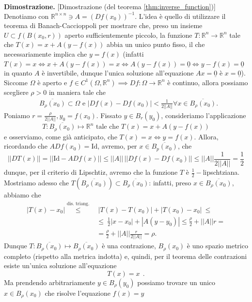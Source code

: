 \noindent \textbf{Dimostrazione. } [Dimostrazione (del teorema \ref{thm:inverse_function})]
	Denotiamo con $\mathbb{R}^{n \times n} \ni A = (Df(x_0))^{-1}$. L'idea è quello di utilizzare il teorema di Banach-Caccioppoli per mostrare che, preso un insieme $U \subset f(B(x_0, r))$ aperto sufficientemente piccolo, la funzione $T: \mathbb{R}^n \to \mathbb{R}^n$ tale che $T(x) = x + A(y - f(x))$ abbia un unico punto fisso, il che necessariamente implica che $y = f(x)$ (infatti $T(x) = x \iff x + A(y-f(x)) = x \iff A(y-f(x)) = \underline{0} \iff y - f(x) = \underline{0}$ in quanto $A$ è invertibile, dunque l'unica soluzione all'equazione $Ax = \underline{0}$ è $x = \underline{0}$). \\
	Siccome $\Omega$ è aperto e $f \in C^1(\Omega, \mathbb{R}^n) \implies Df: \Omega \to \mathbb{R}^n$ è continuo, allora possiamo scegliere $\rho > 0$ in maniera tale che
	\[\begin{aligned}
	&\overline{B_{\rho}(x_0)} \subset \Omega \text{    e    } |Df(x) - Df(x_0)| < \frac{1}{2 || A ||} \forall x \in \overline{B_\rho(x_0)}.
	\end{aligned}\]
	Poniamo $r = \frac{\rho}{2 || A ||}, y_0 = f(x_0)$. Fissato $y \in B_r(y_0)$, consideriamo l'applicazione
	\[
	T : \overline{B_{\rho}(x_0)} \mapsto \mathbb{R}^n \text{ tale che } 	T(x) = x + A(y-f(x))
	\]
	e osserviamo, come già anticipato, che $T(x) = x \iff y=f(x)$. Allora, ricordando che $ADf(x_0) = \text{Id}$, avremo, per $x \in \overline{B_p(x_0)}$, che
	\[
	|| DT(x) || = || \text{Id} - ADf(x) ||  \leq || A || \, || Df(x) - Df(x_0) || \leq || A || \frac{1}{2 || A ||} = \frac{1}{2}
	\]
	dunque, per il criterio di Lipschtiz, avremo che la funzione $T$ è $\frac{1}{2}-$lipschtziana. Mostriamo adesso che $T(\overline{B_\rho(x_0)}) \subset \overline{B_\rho(x_0)}$: infatti, preso $x \in \overline{B_\rho(x_0)}$, abbiamo che
	\[\begin{aligned}
	|T(x) - x_0| \stackrel{\text{dis. triang.}}{\leq} &\ |T(x) - T(x_0)| + |T(x_0) - x_0|\ \leq\\  
	&\leq\ \frac{1}{2} |x-x_0| + |A(y - y_0)| \leq \frac{\rho}{2} + || A || r = \\
	&=\frac{\rho}{2} + || A || \frac{r}{2 || A ||} = \rho.
	\end{aligned}\]
	Dunque $T : \overline{B_\rho(x_0)} \mapsto \overline{B_\rho(x_0)}$ è una contrazione, $B_\rho(x_0)$ è uno spazio metrico completo (rispetto alla metrica indotta) e, quindi, per il teorema delle contrazioni esiste un'unica soluzione all'equazione
	\[T(x) = x\ \ .\]
	Ma prendendo arbitrariamente $y \in B_\rho(y_0)$ possiamo trovare un unico $x \in B_\rho(x_0)$ che risolve l'equazione $f(x) = y$
